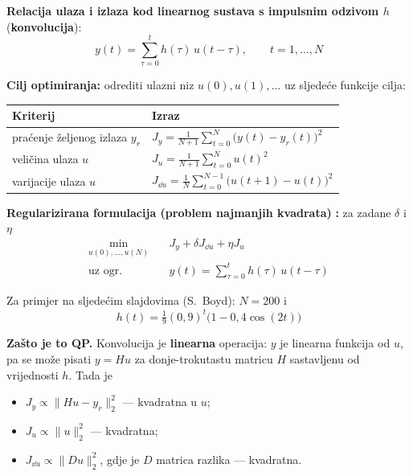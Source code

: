 \begin{zadatak}

\textbf{Relacija ulaza i izlaza kod linearnog sustava s impulsnim odzivom $h$}
(\textbf{konvolucija}):
\[
y(t) = \sum_{\tau=0}^{t} h(\tau)\,u(t-\tau), \qquad t = 1,\dots,N
\]

\textbf{Cilj optimiranja:} odrediti ulazni niz $u(0), u(1), \dots$ uz sljedeće
funkcije cilja:

\begin{center}
\begin{tabular}{P{4.6cm}P{8.4cm}}
\toprule
\textbf{Kriterij} & \textbf{Izraz} \\
\midrule
praćenje željenog izlaza $y_r$ &
$\displaystyle J_y = \frac{1}{N+1}\sum_{t=0}^{N}\big(y(t)-y_r(t)\big)^2$ \\[8pt]
veličina ulaza $u$ &
$\displaystyle J_u = \frac{1}{N+1}\sum_{t=0}^{N}u(t)^2$ \\[8pt]
varijacije ulaza $u$ &
$\displaystyle J_{\dd u} = \frac{1}{N}\sum_{t=0}^{N-1}\big(u(t+1)-u(t)\big)^2$ \\
\bottomrule
\end{tabular}
\end{center}

\textbf{Regularizirana formulacija (problem najmanjih kvadrata)}
\textbf{:} za zadane $\delta$ i $\eta$
\[
\begin{aligned}
\min_{u(0),\dots,u(N)} \quad & J_y + \delta J_{\dd u} + \eta J_u \\
\text{uz ogr.} \quad & y(t) = \sum_{\tau=0}^{t} h(\tau)\,u(t-\tau)
\end{aligned}
\]

Za primjer na sljedećim slajdovima (S.\ Boyd): $N = 200$ i
\[
h(t) = \tfrac19 (0{,}9)^t\big(1 - 0{,}4\cos(2t)\big)
\]

\medskip
\textbf{Zašto je to QP.} Konvolucija je \textbf{linearna} operacija: $y$ je
linearna funkcija od $u$, pa se može pisati $y = Hu$ za donje-trokutastu
matricu $H$ sastavljenu od vrijednosti $h$. Tada je

\begin{itemize}
  \item $J_y \propto \|Hu - y_r\|_2^2$ --- kvadratna u $u$;
  \item $J_u \propto \|u\|_2^2$ --- kvadratna;
  \item $J_{\dd u} \propto \|Du\|_2^2$, gdje je $D$ matrica razlika ---
        kvadratna.
\end{itemize}


\end{zadatak}
